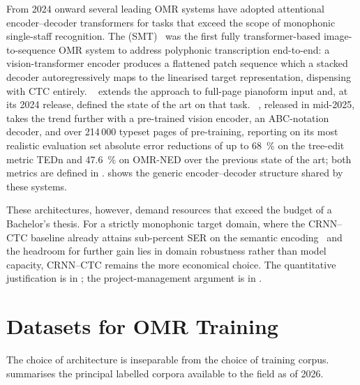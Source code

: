 From 2024 onward several leading OMR systems have adopted attentional
encoder--decoder transformers for tasks that exceed the scope of monophonic
single-staff recognition.
The 
(SMT)~\cite{riosVilaSheetMusicTransformer2024} was the first fully
transformer-based image-to-sequence OMR system to address polyphonic
transcription end-to-end: a vision-transformer encoder produces a flattened
patch sequence which a stacked decoder autoregressively maps to the
linearised target representation, dispensing with CTC entirely.
~\cite{riosVilaSMTPlusPlus2024} extends the approach to
full-page pianoform input and, at its 2024 release, defined the state of
the art on that task.
~\cite{yangLEGATO2025}, released in mid-2025, takes the
trend further with a pre-trained vision encoder, an ABC-notation decoder, and over
214\,000 typeset pages of pre-training, reporting on its most realistic
evaluation set absolute error reductions of up to \SI{68}{\percent} on the
tree-edit metric TEDn and \SI{47.6}{\percent} on OMR-NED over the previous
state of the art; both metrics are defined in .  shows the generic encoder--decoder
structure shared by these systems.



These architectures, however, demand resources that exceed the budget of
a Bachelor's thesis.
For a strictly monophonic target domain, where the CRNN--CTC baseline
already attains sub-percent SER on the semantic
encoding~\cite{calvoZaragozaEndToEndNeural2018} and the headroom for further
gain lies in domain robustness rather than model capacity, CRNN--CTC remains
the more economical choice.
The quantitative justification is in ; the
project-management argument is in .



\section{Datasets for OMR Training}
\label{sec:soa-datasets}

The choice of architecture is inseparable from the choice of training
corpus.
 summarises the principal labelled corpora
available to the field as of 2026.

